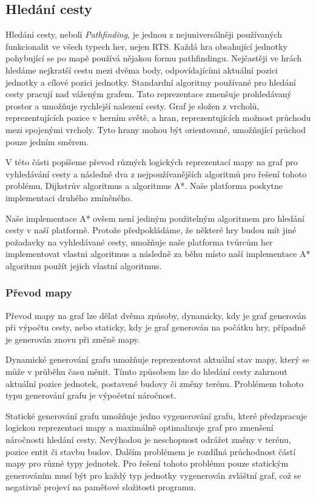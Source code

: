 \subsection{Hledání cesty}
Hledání cesty, neboli \textit{Pathfinding}, je jednou z nejuniversálněji používaných funkcionalit ve všech typech her, nejen RTS. Každá hra obsahující jednotky pohybující se po mapě používá nějakou formu pathfindingu. Nejčastěji ve hrách hledáme nejkratší cestu mezi dvěma body, odpovídajícími aktuální pozici jednotky a cílové pozici jednotky. Standardní algoritmy používané pro hledání cesty pracují nad váženým grafem. Tato reprezentace zmenšuje prohledávaný prostor a umožňuje rychlejší nalezení cesty. Graf je složen z vrcholů, reprezentujících pozice v herním světě, a hran, reprezentujících možnost průchodu mezi spojenými vrcholy. Tyto hrany mohou být orientované, umožňující průchod pouze jedním směrem.

V této části popíšeme převod různých logických reprezentací mapy na graf pro vyhledávání cesty a následně dva z nejpoužívanějších algoritmů pro řešení tohoto problému, Dijkstrův algoritmus a algoritmus A*. Naše platforma poskytne implementaci druhého zmíněného.

Naše implementace A* ovšem není jediným použitelným algoritmem pro hledání cesty v naší platformě. Protože předpokládáme, že některé hry budou mít jiné požadavky na vyhledávané cesty, umožňuje naše platforma tvůrcům her implementovat vlastni algoritmus a následně za běhu místo naší implementace A* algoritmu použít jejich vlastní algoritmus. 

\subsubsection{Převod mapy}
Převod mapy na graf lze dělat dvěma způsoby, dynamicky, kdy je graf generován při výpočtu cesty, nebo staticky, kdy je graf generován na počátku hry, případně je generován znovu při změně mapy.

Dynamické generování grafu umožňuje reprezentovat aktuální stav mapy, který se může v průběhu času měnit. Tímto způsobem lze do hledání cesty zahrnout aktuální pozice jednotek, postavené budovy či změny terénu. Problémem tohoto typu generování grafu je výpočetní náročnost.

Statické generování grafu umožňuje jedno vygenerování grafu, které předzpracuje logickou reprezentaci mapy a maximálně optimalizuje graf pro zmenšení náročnosti hledání cesty. Nevýhodou je neschopnost odrážet změny v terénu, pozice entit či stavbu budov. Dalším problémem je rozdílná průchodnost částí mapy pro různé typy jednotek. Pro řešení tohoto problému pouze statickým generováním musí být pro každý typ jednotky vygenerován zvláštní graf, což se negativně projeví na paměťové složitosti programu.

